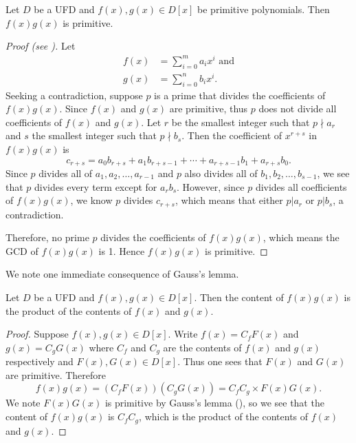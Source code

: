 \begin{lemma}[Gauss]\label{lemma-gauss}
    Let $D$ be a UFD and $f(x), g(x) \in D[x]$ be primitive polynomials. Then $f(x)g(x)$ is primitive.
\end{lemma}
\begin{proof}[Proof (see {\cite[Theorem 18.24]{judson_beezer_2022}})]
    Let
    \begin{align*}
        f(x) &= \sum_{i=0}^m a_ix^i \text{ and}\\
        g(x) &= \sum_{i=0}^n b_ix^i.
    \end{align*}
    Seeking a contradiction, suppose $p$ is a prime that divides the coefficients of $f(x)g(x)$. Since $f(x)$ and $g(x)$ are primitive, thus $p$ does not divide all coefficients of $f(x)$ and $g(x)$. Let $r$ be the smallest integer such that $p \nmid a_r$ and $s$ the smallest integer such that $p \nmid b_s$. Then the coefficient of $x^{r+s}$ in $f(x)g(x)$ is
    \[
        c_{r+s} = a_0b_{r+s} + a_1b_{r+s-1} + \cdots + a_{r+s-1}b_1 + a_{r+s}b_0.
    \]
    Since $p$ divides all of $a_1, a_2, \dots, a_{r-1}$ and $p$ also divides all of $b_1, b_2, \dots, b_{s-1}$, we see that $p$ divides every term except for $a_rb_s$. However, since $p$ divides all coefficients of $f(x)g(x)$, we know $p$ divides $c_{r+s}$, which means that either $p \vert a_r$ or $p \vert b_s$, a contradiction.
    
    Therefore, no prime $p$ divides the coefficients of $f(x)g(x)$, which means the GCD of $f(x)g(x)$ is 1. Hence $f(x)g(x)$ is primitive.
\end{proof}

We note one immediate consequence of Gauss's lemma.

\begin{corollary}\label{corollary-content-of-product-is-product-of-content-for-polynomials}
    Let $D$ be a UFD and $f(x), g(x) \in D[x]$. Then the content of $f(x)g(x)$ is the product of the contents of $f(x)$ and $g(x)$.
\end{corollary}
\begin{proof}
    Suppose $f(x), g(x) \in D[x]$. Write $f(x) = C_f F(x)$ and $g(x) = C_g G(x)$ where $C_f$ and $C_g$ are the contents of $f(x)$ and $g(x)$ respectively and $F(x), G(x) \in D[x]$. Thus one sees that $F(x)$ and $G(x)$ are primitive. Therefore
    \[
        f(x)g(x) = (C_f F(x))(C_g G(x)) = C_fC_g \times F(x)G(x).
    \]
    We note $F(x)G(x)$ is primitive by Gauss's lemma (), so we see that the content of $f(x)g(x)$ is $C_fC_g$, which is the product of the contents of $f(x)$ and $g(x)$.
\end{proof}

